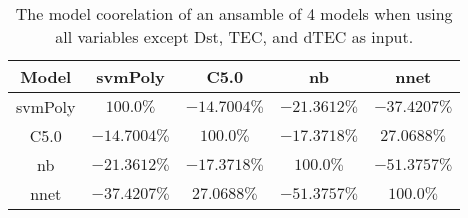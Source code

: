 \begin{table}[!ht]
	\centering
	\begin{tabular}{|c|c|c|c|c|}
		\hline
		Model & svmPoly & C5.0 & nb & nnet \\ \hline
		svmPoly & $100.0\%$ & $-14.7004\%$ & $-21.3612\%$ & $-37.4207\%$ \\ \hline
		C5.0 & $-14.7004\%$ & $100.0\%$ & $-17.3718\%$ & $27.0688\%$ \\ \hline
		nb & $-21.3612\%$ & $-17.3718\%$ & $100.0\%$ & $-51.3757\%$ \\ \hline
		nnet & $-37.4207\%$ & $27.0688\%$ & $-51.3757\%$ & $100.0\%$ \\ \hline
	\end{tabular}
	\caption{The model coorelation of an ansamble of 4 models when using all variables except Dst, TEC, and dTEC as input.}
	\label{tab:ansamble4:noTEC}
\end{table}
